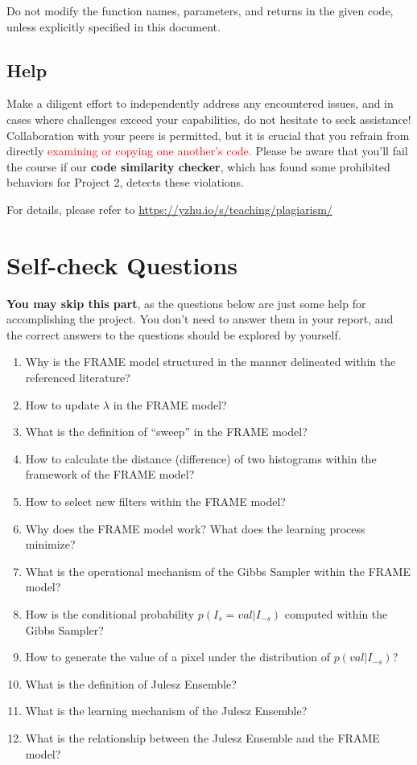 \documentclass[11pt]{article}
\begin{document}
Do not modify the function names, parameters, and returns in the given code, unless explicitly specified in this document. 

\subsection{Help}

Make a diligent effort to independently address any encountered issues, and in cases where challenges exceed your capabilities, do not hesitate to seek assistance! Collaboration with your peers is permitted, but it is crucial that you refrain from directly \textcolor{red}{examining or copying one another's code.}  Please be aware that you'll fail the course if our \textbf{code similarity checker}, which has found some prohibited behaviors for Project 2, detects these violations.

For details, please refer to \url{https://yzhu.io/s/teaching/plagiarism/}

\clearpage

\section{Self-check Questions}

\textbf{You may skip this part}, as the questions below are just some help for accomplishing the project. You don't need to answer them in your report, and the correct answers to the questions should be explored by yourself. 
\begin{enumerate}
    \item Why is the FRAME model structured in the manner delineated within the referenced literature?
    \item How to update $\lambda$ in the FRAME model?
    \item What is the definition of ``sweep'' in the FRAME model?
    \item How to calculate the distance (difference) of two histograms within the framework of the FRAME model?
    \item How to select new filters within the FRAME model?
    \item Why does the FRAME model work? What does the learning process minimize?
    \item What is the operational mechanism of the Gibbs Sampler within the FRAME model?
    \item How is the conditional probability $p(I_s = val|I_{-s})$ computed within the Gibbs Sampler?
    \item How to generate the value of a pixel under the distribution of $p(val|I_{-s})$?
    \item What is the definition of  Julesz Ensemble?
    \item What is the learning mechanism of the Julesz Ensemble?
    \item What is the relationship between the Julesz Ensemble and the FRAME model?
\end{enumerate}
\end{document}
